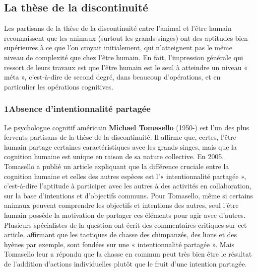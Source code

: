 \subsection{La thèse de la discontinuité}
Les partisans de la thèse de la discontinuité entre l’animal et l’être humain reconnaissent que les animaux (surtout les grands singes) ont des aptitudes bien supérieures à ce que l’on croyait initialement, qui n’atteignent pas le même niveau de complexité que chez l’être humain. En fait, l’impression générale qui ressort de leurs travaux est que l’être humain est le seul à atteindre un niveau « méta », c’est-à-dire de second degré, dans beaucoup d’opérations, et en particulier les opérations cognitives.
\subsubsection*{1\quad Absence d’intentionnalité partagée}
Le psychologue cognitif américain \textbf{Michael Tomasello} (1950-) est l’un des plus fervents partisans de la thèse de la discontinuité. Il affirme que, certes, l’être humain partage certaines caractéristiques avec les grands singes, mais que la cognition humaine est unique en raison de sa nature collective. En 2005, Tomasello a publié un article expliquant que la différence cruciale entre la cognition humaine et celles des autres espèces est l’« intentionnalité partagée », c’est-à-dire l’aptitude à participer avec les autres à des activités en collaboration, sur la base d’intentions et d’objectifs communs. Pour Tomasello, même si certains animaux peuvent comprendre les objectifs et intentions des autres, seul l’être humain possède la motivation de partager ces éléments pour agir avec d’autres. Plusieurs spécialistes de la question ont écrit des commentaires critiques sur cet article, affirmant que les tactiques de chasse des chimpanzés, des lions et des hyènes par exemple, sont fondées sur une « intentionnalité partagée ». Mais Tomasello leur a répondu que la chasse en commun peut très bien être le résultat de l’addition d’actions individuelles plutôt que le fruit d’une intention partagée.
